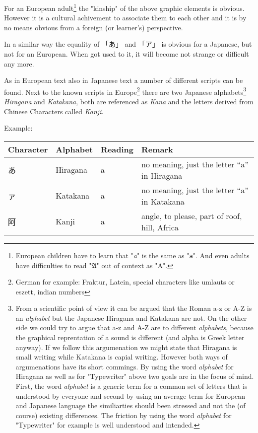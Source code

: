For an European adult\footnote{European children have to learn that
"\textit{a}" is the same as "\texttt{a}". And even adults have difficulties to
read "$\mathfrak{A}$" out of context as "A".}  the "kinship" of the above
graphic elements is obvious. However it is a cultural achivement to associate
them to each other and it is by no means obvious from a foreign (or learner's)
perspective. 

In a similar way the equality of {「あ」} and {「ア」} is obvious for a
Japanese, but not for an European. When got used to it, it will become not
strange or difficult any more.

As in European text also in Japanese text a number of different scripts can be
found. Next to the known scripts in Europe\footnote{German for example:
Fraktur, Latein, special characters like umlauts or eszett, indian numbers}
there are two Japanese alphabets\footnote{ From a scientific point of view it
can be argued that the Roman a-z or A-Z is an \textit{alphabet} but the
Japanese Hiragana and Katakana are not. On the other side we could try to argue
that a-z and A-Z are to different \textit{alphabets}, because the graphical
reprentation of a sound is different (and alpha is Greek letter anyway). If we
follow this argumenation we might state that Hiragana is small writing while
Katakana is capial writing. However both ways of argumenations have its short
commings. By using the word \textit{alphabet} for Hiragana as well as for
"Typewriter" above two goals are in the focus of mind. First, the word
\textit{alphabet} is a generic term for a common set of letters that is
understood by everyone and second by using an average term for European and
Japanese language the similiarties should been stressed and not the (of course)
existing differences. The friction by using the word \textit{alphabet} for
"Typewriter" for example is well understood and intended. } \textit{Hiragana} and
\textit{Katakana}, both are referenced as \textit{Kana} and the letters derived
from Chinese Characters called \textit{Kanji}.


Example:

\begin{center}
\begin{tabular}{|l|l|l|l|}
\textbf{Character}&\textbf{Alphabet}&\textbf{Reading}&\textbf{Remark}\\\hline
あ& Hiragana & a & no meaning, just the letter  ``a'' in Hiragana \\
ァ& Katakana & a & no meaning, just the letter ``a'' in Katakana \\
阿& Kanji    & a & { angle, to please, part of roof, hill, Africa}\\
\end{tabular}
\end{center}

